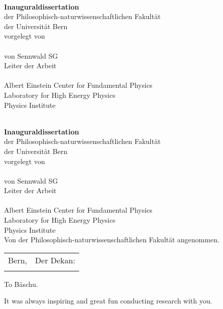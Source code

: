 \begin{titlepage}
	\begin{center}
		\null
		\vfill
		\textbf{\LARGE\Title}\\[20mm]
		\textbf{\large Inauguraldissertation}\\
		{\large der Philosophisch-naturwissenschaftlichen Fakultät}\\
		{\large der Universität Bern}\\[20mm]
		{\large vorgelegt von}\\[10mm]
		\textbf{\Large\Author}\\[10mm]
		{\large von Sennwald SG}\\[20mm]
		{\large Leiter der Arbeit}\\
		\textbf{\large\Supervisor}\\[10mm]
		{\large Albert Einstein Center for Fundamental Physics}\\
		{\large Laboratory for High Energy Physics}\\
		{\large Physics Institute}\\
		\vfill
	\end{center}
	\clearpage
	\null
	\clearpage
	\begin{center}
		\null
		\vfill
		\textbf{\LARGE\Title}\\[20mm]
		\textbf{\large Inauguraldissertation}\\
		{\large der Philosophisch-naturwissenschaftlichen Fakultät}\\
		{\large der Universität Bern}\\[20mm]
		{\large vorgelegt von}\\[10mm]
		\textbf{\Large\Author}\\[10mm]
		{\large von Sennwald SG}\\[20mm]
		{\large Leiter der Arbeit}\\
		\textbf{\large\Supervisor}\\[10mm]
		{\large Albert Einstein Center for Fundamental Physics}\\
		{\large Laboratory for High Energy Physics}\\
		{\large Physics Institute}\\[10mm]
		{\large Von der Philosophisch-naturwissenschaftlichen Fakultät angenommen.}\\[10mm]
		\begin{tabu} to \textwidth {Xl}
			{\large Bern, \Date} &	{\large Der Dekan:} \\
			&						{\large\Dean}
		\end{tabu}
		\vfill
	\end{center}
	\clearpage
\end{titlepage}


To Bäschu.

\bigskip

It was always inspiring and great fun conducting research with you.
\clearpage